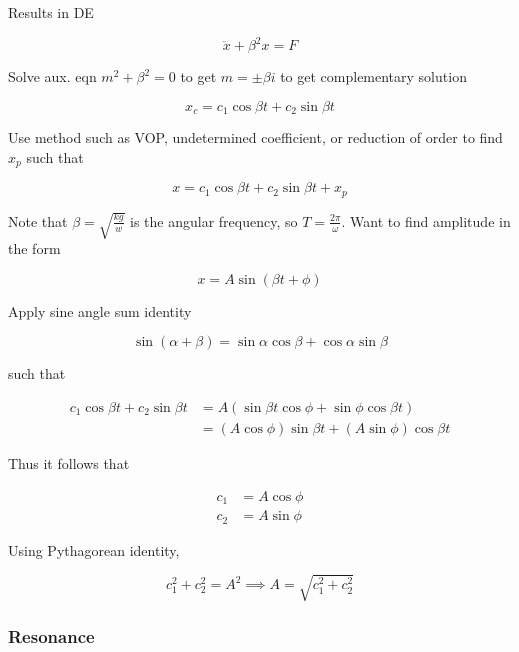 Results in DE

\begin{equation}
    \ddot x +\beta^2 x= F
\end{equation}

Solve aux. eqn $m^2+\beta^2=0$ to get $m =\pm \beta i$ to get complementary solution

\begin{equation}
    x_c=c_1\cos\beta t + c_2\sin\beta t
\end{equation}

Use method such as VOP, undetermined coefficient, or reduction of order to find $x_p$ such that

\begin{equation}
    x = c_1\cos\beta t + c_2\sin\beta t + x_p
\end{equation}

Note that $\beta = \sqrt{\frac{kg}{w}}$ is the angular frequency, so $T=\frac{2\pi}{\omega}$.
Want to find amplitude in the form

\begin{equation}
    x=A\sin (\beta t+\phi)
\end{equation}

Apply sine angle sum identity

\begin{equation}
    \sin(\alpha + \beta)=\sin\alpha \cos\beta + \cos\alpha \sin\beta
\end{equation}

such that

\begin{align}
    c_1\cos\beta t + c_2\sin\beta t&=A(\sin\beta t\cos\phi +\sin\phi \cos\beta t)\\
    &=(A\cos\phi)\sin\beta t+(A\sin\phi)\cos\beta t
\end{align}

Thus it follows that

\begin{align}
    c_1&=A\cos\phi\\
    c_2&=A\sin\phi
\end{align}

Using Pythagorean identity,

\begin{equation}
    c_1^2+c_2^2=A^2\implies A=\sqrt{c_1^2+c_2^2}
\end{equation}

\subsubsection{Resonance}

